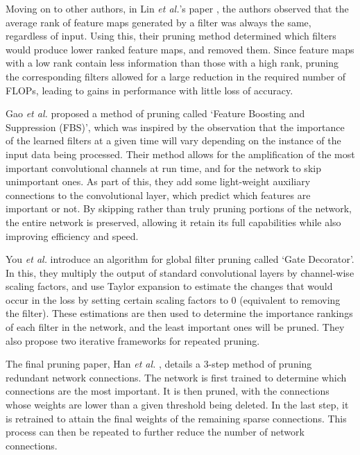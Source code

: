 \documentclass[11pt,a4paper,oldfontcommands]{memoir}
\begin{document}
Moving on to other authors, in Lin \textit{et al.}'s paper \cite{HRank}, the authors observed that the average rank of feature maps generated by a filter was always the same, regardless of input. Using this, their pruning method determined which filters would produce lower ranked feature maps, and removed them. Since feature maps with a low rank contain less information than those with a high rank, pruning the corresponding filters allowed for a large reduction in the required number of FLOPs, leading to gains in performance with little loss of accuracy.

Gao \textit{et al.} \cite{DCPruning} proposed a method of pruning called `Feature Boosting and Suppression (FBS)', which was inspired by the observation that the importance of the learned filters at a given time will vary depending on the instance of the input data being processed. Their method allows for the amplification of the most important convolutional channels at run time, and for the network to skip unimportant ones. As part of this, they add some light-weight auxiliary connections to the convolutional layer, which predict which features are important or not. By skipping rather than truly pruning portions of the network, the entire network is preserved, allowing it retain its full capabilities while also improving efficiency and speed. 

You \textit{et al.} \cite{GateD} introduce an algorithm for global filter pruning called `Gate Decorator'. In this, they multiply the output of standard convolutional layers by channel-wise scaling factors, and use Taylor expansion to estimate the changes that would occur in the loss by setting certain scaling factors to 0 (equivalent to removing the filter). These estimations are then used to determine the importance rankings of each filter in the network, and the least important ones will be pruned. They also propose two iterative frameworks for repeated pruning.

The final pruning paper, Han \textit{et al.} \cite{LWC}, details a 3-step method of pruning redundant network connections. The network is first trained to determine which connections are the most important. It is then pruned, with the connections whose weights are lower than a given threshold being deleted. In the last step, it is retrained to attain the final weights of the remaining sparse connections. This process can then be repeated to further reduce the number of network connections.
\end{document}
